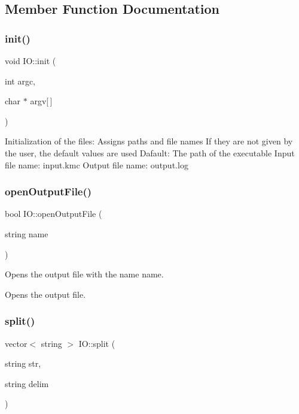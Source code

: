 \subsection{Member Function Documentation}
\mbox{\label{classIO_a502bfdc83c767e8ae0861db0aa8a02d2}} 
\subsubsection{\texorpdfstring{init()}{init()}}
{\footnotesize\ttfamily void I\+O\+::init (\begin{DoxyParamCaption}\item[{int}]{argc,  }\item[{char $\ast$}]{argv\mbox{[}$\,$\mbox{]} }\end{DoxyParamCaption})}

Initialization of the files\+: Assigns paths and file names If they are not given by the user, the default values are used Dafault\+: The path of the executable Input file name\+: input.\+kmc Output file name\+: output.\+log \mbox{\label{classIO_a430eb7b5efc3f8467ffc0b507984e705}} 
\subsubsection{\texorpdfstring{open\+Output\+File()}{openOutputFile()}}
{\footnotesize\ttfamily bool I\+O\+::open\+Output\+File (\begin{DoxyParamCaption}\item[{string}]{name }\end{DoxyParamCaption})}



Opens the output file with the name name. 

Opens the output file. \mbox{\label{classIO_a33419de8dcf51c88e18c8e66a9644d6c}} 
\subsubsection{\texorpdfstring{split()}{split()}}
{\footnotesize\ttfamily vector$<$ string $>$ I\+O\+::split (\begin{DoxyParamCaption}\item[{string}]{str,  }\item[{string}]{delim }\end{DoxyParamCaption})}



